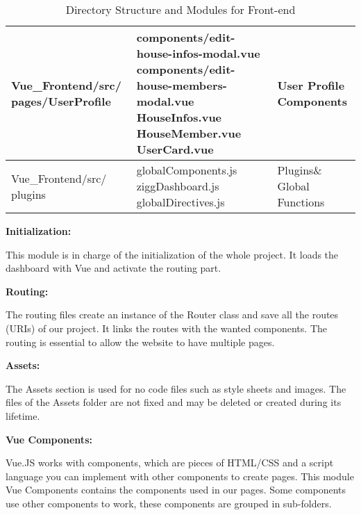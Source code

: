 \documentclass[conference]{IEEEtran}
\begin{document}
\begin{table}[H]
\begin{tabular}{|m{2.6cm}|m{3.5cm}|m{1.6cm}|}
Vue\_Frontend/src/ pages/UserProfile & 
components/edit-house-infos-modal.vue \newline
components/edit-house-members-modal.vue \newline
HouseInfos.vue \newline
HouseMember.vue \newline
UserCard.vue & 
User Profile Components \\ \hline

Vue\_Frontend/src/ plugins & 
globalComponents.js \newline
ziggDashboard.js \newline
globalDirectives.js & 
Plugins\& Global Functions\\ \hline

\end{tabular}
\caption{Directory Structure and Modules for Front-end}
\end{table}

\vspace{0.5cm}

\textbf{Initialization:}

This module is in charge of the initialization of the whole project. It loads the dashboard with Vue and activate the routing part.

\vspace{0.5cm}

\textbf{Routing:}

The routing files create an instance of the Router class and save all the routes (URIs) of our project. It links the routes with the wanted components. The routing is essential to allow the website to have multiple pages.

\vspace{0.5cm}

\textbf{Assets:}

The Assets section is used for no code files such as style sheets and images. The files of the Assets folder are not fixed and may be deleted or created during its lifetime.

\vspace{0.5cm}

\textbf{Vue Components:}

Vue.JS works with components, which are pieces of HTML/CSS and a script language you can implement with other components to create pages. This module Vue Components contains the components used in our pages. Some components use other components to work, these components are grouped in sub-folders.
\end{document}
